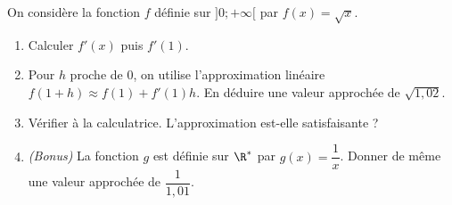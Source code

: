 \documentclass[1,exos,b,prof,e]{phBook}
\begin{document}
\begin{exercice}
	On considère la fonction $f$ définie sur $]0;+\infty[$ par $f(x)=\sqrt{x}$.
	\begin{enumerate}
		\item Calculer $f'(x)$ puis $f'(1)$.
		\item Pour $h$ proche de $0$, on utilise l'approximation linéaire
		$f(1+h)\approx f(1)+f'(1)h$. En déduire une valeur approchée de $\sqrt{1,02}$.
		\item Vérifier à la calculatrice. L'approximation est-elle satisfaisante ?
		\item \emph{(Bonus)} La fonction $g$ est définie sur $\R^*$ par $g(x)=\dfrac{1}{x}$.
		Donner de même une valeur approchée de $\dfrac{1}{1,01}$.
	\end{enumerate}

\end{exercice}
\end{document}
